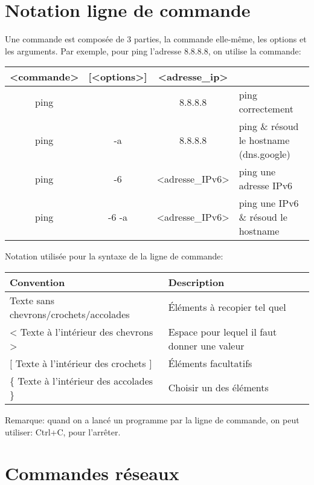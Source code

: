 \documentclass[a4paper]{article}
\begin{document}
\section{Notation ligne de commande}





Une commande est composée de 3 parties, la commande elle-même, les options et les arguments. Par exemple, pour ping l'adresse 8.8.8.8, on utilise la commande:
\begin{center}
\begin{tabular}{|ccc|l|} \hline
<commande> & [<options>] & <adresse\_ip> & \\ \hline
ping & & 8.8.8.8 & ping correctement \\
ping & -a & 8.8.8.8 & ping \& résoud le hostname (dns.google) \\
ping & -6 & <adresse\_IPv6> & ping une adresse IPv6 \\
ping & -6 -a & <adresse\_IPv6> & ping une IPv6 \& résoud le hostname \\ \hline
\end{tabular}
\end{center}

Notation utilisée pour la syntaxe de la ligne de commande:
\begin{center}
\begin{tabular}{p{7.5cm}p{7.5cm}}
\textbf{Convention} & \textbf{Description} \\ \hline
Texte sans chevrons/crochets/accolades & Éléments à recopier tel quel \\
< \; Texte à l’intérieur des chevrons \; > & Espace pour lequel il faut donner une valeur \\
$[$ \; Texte à l'intérieur des crochets \; $]$ & Éléments facultatifs \\
\{ \; Texte à l’intérieur des accolades \; \} & Choisir un des éléments \\
\end{tabular}
\end{center}

Remarque: quand on a lancé un programme par la ligne de commande, on peut utiliser: Ctrl+C, pour l'arrêter.















\section{Commandes réseaux}
\end{document}
